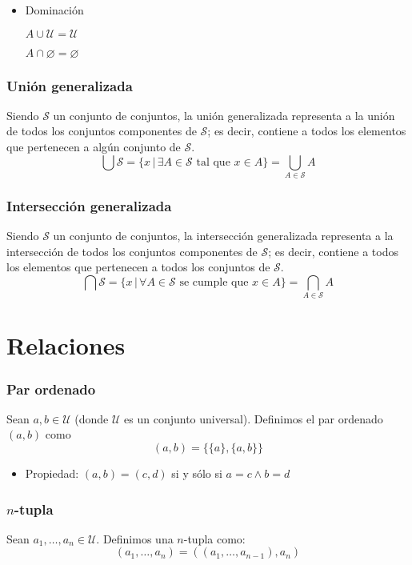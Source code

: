 \begin{multicols}{2}
\begin{itemize}
        \item Dominación
        
        $A \cup \mathcal{U} = \mathcal{U}$
    
        $A \cap \varnothing = \varnothing$
        
    \end{itemize}
    
    \subsubsection*{Unión generalizada}
    Siendo $\mathcal{S}$ un conjunto de conjuntos, la unión generalizada representa a la unión de todos los conjuntos componentes de $\mathcal{S}$; es decir, contiene a todos los elementos que pertenecen a algún conjunto de $\mathcal{S}$.
    $$
    \bigcup \mathcal{S} = \{x \,|\, \exists A \in \mathcal{S} \text{ tal que } x \in A\} = \bigcup_{A \in \mathcal{S}} A
    $$
    
    \subsubsection*{Intersección generalizada}
    Siendo $\mathcal{S}$ un conjunto de conjuntos, la intersección generalizada representa a la intersección de todos los conjuntos componentes de $\mathcal{S}$; es decir, contiene a todos los elementos que pertenecen a todos los conjuntos de $\mathcal{S}$.
    $$
    \bigcap \mathcal{S} = \{x \,|\, \forall A \in \mathcal{S} \text{ se cumple que } x \in A\} = \bigcap_{A \in \mathcal{S}} A
    $$
    
    \section{Relaciones}
    \subsubsection*{Par ordenado}
    Sean $a,b \in \mathcal{U}$ (donde $\mathcal{U}$ es un conjunto universal). Definimos el par ordenado $(a,b)$ como
    $$
    (a,b) = \{\{a\}, \{a,b\}\}
    $$
    \begin{itemize}
        \item Propiedad: $(a,b) = (c,d)$ si y sólo si $a = c \wedge b = d$
    \end{itemize}
    
    \subsubsection*{$n$-tupla}
    Sean $a_1, \ldots,a_n \in \mathcal{U}$. Definimos una $n$-tupla como:
    $$
    (a_1, \ldots, a_n) = ((a_1, \ldots, a_{n-1}), a_n)
    $$
    

\end{multicols}
